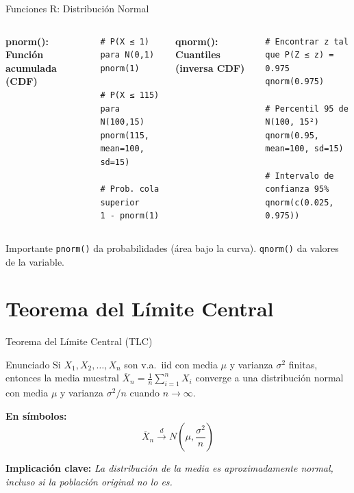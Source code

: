 \documentclass[aspectratio=169,11pt]{beamer}
\begin{document}
\begin{frame}[fragile]{Funciones R: Distribución Normal}
\begin{columns}[T]
\textbf{pnorm(): Función acumulada (CDF)}
\begin{lstlisting}
# P(X ≤ 1) para N(0,1)
pnorm(1)

# P(X ≤ 115) para N(100,15)
pnorm(115, mean=100, sd=15)

# Prob. cola superior
1 - pnorm(1)
\end{lstlisting}

\pause
{}
\textbf{qnorm(): Cuantiles (inversa CDF)}
\begin{lstlisting}
# Encontrar z tal que P(Z ≤ z) = 0.975
qnorm(0.975)

# Percentil 95 de N(100, 15²)
qnorm(0.95, mean=100, sd=15)

# Intervalo de confianza 95%
qnorm(c(0.025, 0.975))
\end{lstlisting}
\end{columns}

\pause
\vspace{0.3cm}
\begin{block}{Importante}
\texttt{pnorm()} da probabilidades (área bajo la curva). \texttt{qnorm()} da valores de la variable.
\end{block}
\end{frame}

\section{Teorema del Límite Central}

\begin{frame}{Teorema del Límite Central (TLC)}
\small
\begin{block}{Enunciado}
Si $X_1, X_2, \ldots, X_n$ son v.a.\ iid con media $\mu$ y varianza $\sigma^2$ finitas, entonces la media muestral
$\overline{X}_n = \frac{1}{n}\sum_{i=1}^{n} X_i$
converge a una distribución normal con media $\mu$ y varianza $\sigma^2/n$ cuando $n \to \infty$.
\end{block}

\pause
\textbf{En símbolos:}
\[
\overline{X}_n \xrightarrow{d} N\left(\mu, \frac{\sigma^2}{n}\right)
\]

\pause
\textbf{Implicación clave:} \textit{La distribución de la media es aproximadamente normal, incluso si la población original no lo es.}
\end{frame}
\end{document}
